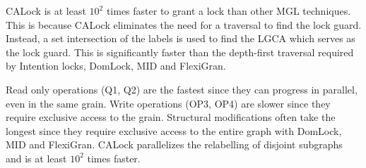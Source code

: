 CALock is at least $10^2$ times faster to grant a lock than other MGL techniques. This is because CALock eliminates the need for a traversal to find the lock guard. Instead, a set intersection of the labels is used to find the LGCA which serves as the lock guard. This is significantly faster than the depth-first traversal required by Intention locks, DomLock, MID and FlexiGran.

Read only operations (Q1, Q2) are the fastest since they can progress in parallel, even in the same grain. 
Write operations (OP3, OP4) are slower since they require exclusive access to the grain. Structural modifications often take the longest since they require exclusive access to the entire graph with DomLock, MID and FlexiGran. CALock parallelizes the relabelling of disjoint subgraphs and is at least $10^2$ times faster. 







